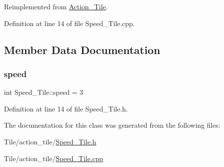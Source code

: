 Reimplemented from \hyperlink{class_action___tile_aa366fba2ea9d3947c28c45f939ee0217}{Action\+\_\+\+Tile}.



Definition at line 14 of file Speed\+\_\+\+Tile.\+cpp.



\subsection{Member Data Documentation}
\hypertarget{class_speed___tile_af973cfe789cf50b9622db1fda43efd3c}{}\label{class_speed___tile_af973cfe789cf50b9622db1fda43efd3c} 
\subsubsection{\texorpdfstring{speed}{speed}}
{\footnotesize\ttfamily int Speed\+\_\+\+Tile\+::speed = 3}



Definition at line 14 of file Speed\+\_\+\+Tile.\+h.



The documentation for this class was generated from the following files\+:\begin{DoxyCompactItemize}
\item 
Tile/action\+\_\+tile/\hyperlink{_speed___tile_8h}{Speed\+\_\+\+Tile.\+h}\item 
Tile/action\+\_\+tile/\hyperlink{_speed___tile_8cpp}{Speed\+\_\+\+Tile.\+cpp}\end{DoxyCompactItemize}
